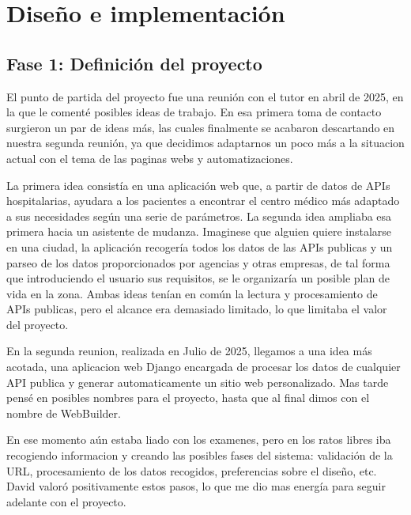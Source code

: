 
\cleardoublepage
\chapter{Diseño e implementación}
\label{sec:diseno}


\section{Fase 1: Definición del proyecto}
\label{sec:definicion-proyecto}

El punto de partida del proyecto fue una reunión con el tutor en abril de 2025, en la que le comenté posibles ideas de trabajo.
En esa primera toma de contacto surgieron un par de ideas más, las cuales finalmente se acabaron descartando en nuestra segunda reunión,
ya que decidimos adaptarnos un poco más a la situacion actual con el tema de las paginas webs y automatizaciones.


La primera idea consistía en una aplicación web que, a partir de datos de APIs hospitalarias, ayudara a los pacientes a encontrar el centro 
médico más adaptado a sus necesidades según una serie de parámetros. 
La segunda idea ampliaba esa primera hacia un asistente de mudanza. Imaginese que alguien quiere instalarse en una ciudad, la aplicación
recogería todos los datos de las APIs publicas y un parseo de los datos proporcionados por agencias y otras empresas, de tal forma que 
introduciendo el usuario sus requisitos, se le organizaría un posible plan de vida en la zona.
Ambas ideas tenían en común la lectura y procesamiento de APIs publicas, pero el alcance era demasiado limitado, lo que limitaba el valor del 
proyecto. 


En la segunda reunion, realizada en Julio de 2025, llegamos a una idea más acotada, una aplicacion web Django encargada de procesar los datos
de cualquier API publica y generar automaticamente un sitio web personalizado. Mas tarde pensé en posibles nombres para el proyecto, hasta que 
al final dimos con el nombre de WebBuilder.


En ese momento aún estaba liado con los examenes, pero en los ratos libres iba recogiendo informacion y creando las posibles fases del sistema:
validación de la URL, procesamiento de los datos recogidos, preferencias sobre el diseño, etc. David valoró positivamente estos pasos, lo que 
me dio mas energía para seguir adelante con el proyecto.


